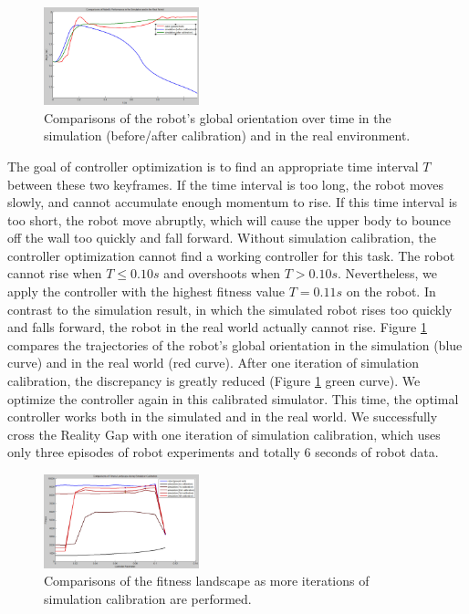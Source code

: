 \begin{figure}[!b]
  \centering
  \includegraphics[width=0.4\textwidth]{figures/simRobotCompare}
  \caption{Comparisons of the robot's global orientation over time in the simulation (before/after calibration) and in the real environment.}
  \label{fig:simRobotCompare}
\end{figure}


The goal of controller optimization is to find an appropriate time interval $T$ between these two keyframes. If the time interval is too long, the robot moves slowly, and cannot accumulate enough momentum to rise. If this time interval is too short, the robot move abruptly, which will cause the upper body to bounce off the wall too quickly and fall forward. Without simulation calibration, the controller optimization cannot find a working controller for this task. The robot cannot rise when $T\leq 0.10s$ and overshoots when $T > 0.10s$. Nevertheless, we apply the controller with the highest fitness value $T=0.11s$ on the robot. In contrast to the simulation result, in which the simulated robot rises too quickly and falls forward, the robot in the real world actually cannot rise. Figure \ref{fig:simRobotCompare} compares the trajectories of the robot's global orientation in the simulation (blue curve) and in the real world (red curve). After one iteration of simulation calibration, the discrepancy is greatly reduced (Figure \ref{fig:simRobotCompare} green curve). We optimize the controller again in this calibrated simulator. This time, the optimal controller works both in the simulated and in the real world. We successfully cross the Reality Gap with one iteration of simulation calibration, which uses only three episodes of robot experiments and totally 6 seconds of robot data.

\begin{figure}[!b]
  \centering
  \includegraphics[width=0.4\textwidth]{figures/fitnessLandscape}
  \caption{Comparisons of the fitness landscape as more iterations of simulation calibration are performed.}
  \label{fig:fitnessLandscape}
\end{figure}


